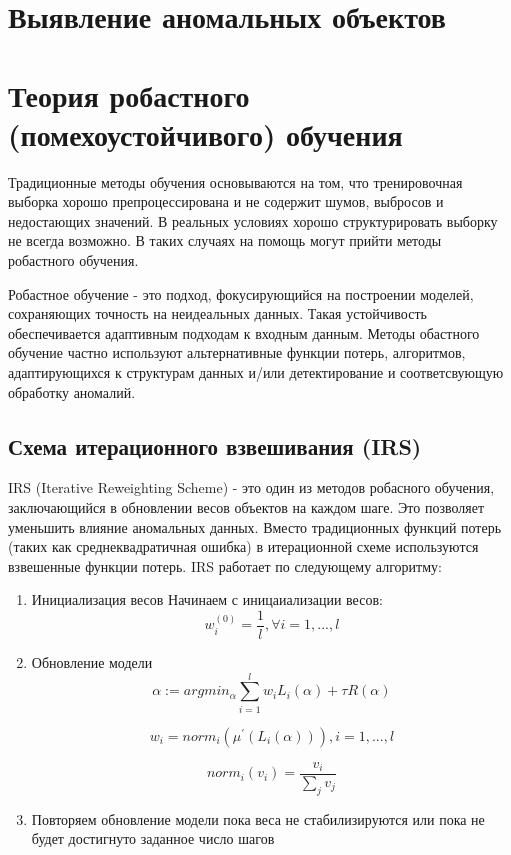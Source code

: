 \section{Выявление аномальных объектов}
\section{Теория робастного (помехоустойчивого) обучения}
Традиционные методы обучения основываются на
том, что тренировочная выборка хорошо препроцессирована и не содержит шумов,
выбросов и недостающих значений. В реальных условиях хорошо структурировать
выборку не всегда возможно. В таких случаях на помощь могут прийти методы
робастного обучения.

Робастное обучение - это подход, фокусирующийся на построении моделей,
сохраняющих точность на неидеальных данных. Такая устойчивость обеспечивается
адаптивным подходам к входным данным. Методы обастного обучение частно
используют альтернативные функции потерь, алгоритмов, адаптирующихся к
структурам данных и/или детектирование и соответсвующую обработку аномалий.

\subsection{Схема итерационного взвешивания (IRS)}
IRS (Iterative Reweighting Scheme) - это один из
методов робасного обучения, заключающийся в обновлении весов объектов на каждом
шаге. Это позволяет уменьшить влияние аномальных данных. Вместо традиционных
функций потерь (таких как среднеквадратичная ошибка) в итерационной схеме
используются взвешенные функции потерь. IRS работает по следующему алгоритму:

\begin{enumerate}
  \item Инициализация весов
    Начинаем с иницаиализации весов:
    \[w_i^{(0)} = \frac{1}{l}, \forall i = 1, ..., l\]
  \item Обновление модели
    \[\alpha := arg min_{\alpha} \sum_{i=1}^l w_i L_i\left(\alpha\right) + \tau R\left(\alpha\right)\]

    \[w_i = norm_i\left( \mu^{'}\left( L_i(\alpha) \right) \right), i = 1, ..., l\]

    \[norm_i(v_i) = \frac{v_i}{\sum_j v_j}\]
  \item Повторяем обновление модели пока веса не стабилизируются или пока не
    будет достигнуто заданное число шагов
\end{enumerate}

